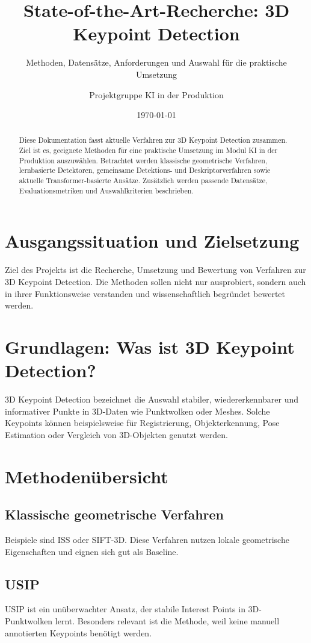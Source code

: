 \documentclass[11pt,a4paper]{article}
\title{State-of-the-Art-Recherche: 3D Keypoint Detection}
\subtitle{Methoden, Datensätze, Anforderungen und Auswahl für die praktische Umsetzung}
\author{Projektgruppe KI in der Produktion}
\date{\today}
\begin{document}
\maketitle

\begin{abstract}
Diese Dokumentation fasst aktuelle Verfahren zur 3D Keypoint Detection zusammen. Ziel ist es, geeignete Methoden für eine praktische Umsetzung im Modul KI in der Produktion auszuwählen. Betrachtet werden klassische geometrische Verfahren, lernbasierte Detektoren, gemeinsame Detektions- und Deskriptorverfahren sowie aktuelle Transformer-basierte Ansätze. Zusätzlich werden passende Datensätze, Evaluationsmetriken und Auswahlkriterien beschrieben.
\end{abstract}

\tableofcontents

\section{Ausgangssituation und Zielsetzung}
Ziel des Projekts ist die Recherche, Umsetzung und Bewertung von Verfahren zur 3D Keypoint Detection. Die Methoden sollen nicht nur ausprobiert, sondern auch in ihrer Funktionsweise verstanden und wissenschaftlich begründet bewertet werden.

\section{Grundlagen: Was ist 3D Keypoint Detection?}
3D Keypoint Detection bezeichnet die Auswahl stabiler, wiedererkennbarer und informativer Punkte in 3D-Daten wie Punktwolken oder Meshes. Solche Keypoints können beispielsweise für Registrierung, Objekterkennung, Pose Estimation oder Vergleich von 3D-Objekten genutzt werden.

\section{Methodenübersicht}
\subsection{Klassische geometrische Verfahren}
Beispiele sind ISS oder SIFT-3D. Diese Verfahren nutzen lokale geometrische Eigenschaften und eignen sich gut als Baseline.

\subsection{USIP}
USIP ist ein unüberwachter Ansatz, der stabile Interest Points in 3D-Punktwolken lernt. Besonders relevant ist die Methode, weil keine manuell annotierten Keypoints benötigt werden.
\end{document}
